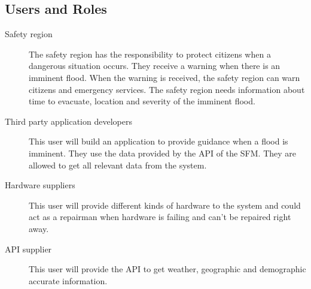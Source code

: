 \subsection{Users and Roles}
\label{subsec:users-roles}
\begin{description}
	\item[Safety region] The safety region has the responsibility to protect citizens when a dangerous situation occurs. They receive a warning when there is an imminent flood. When the warning is received, the safety region can warn citizens and emergency services. The safety region needs information about time to evacuate, location and severity of the imminent flood.
	\item[Third party application developers] This user will build an application to provide guidance when a flood is imminent. They use the data provided by the \gls{API} of the \gls{SFM}. They are allowed to get all relevant data from the system.
	\item[Hardware suppliers] This user will provide different kinds of hardware to the system and could act as a repairman when hardware is failing and can't be repaired right away.
	\item[API supplier] This user will provide the API to get weather, geographic and demographic accurate information.
\end{description} 

